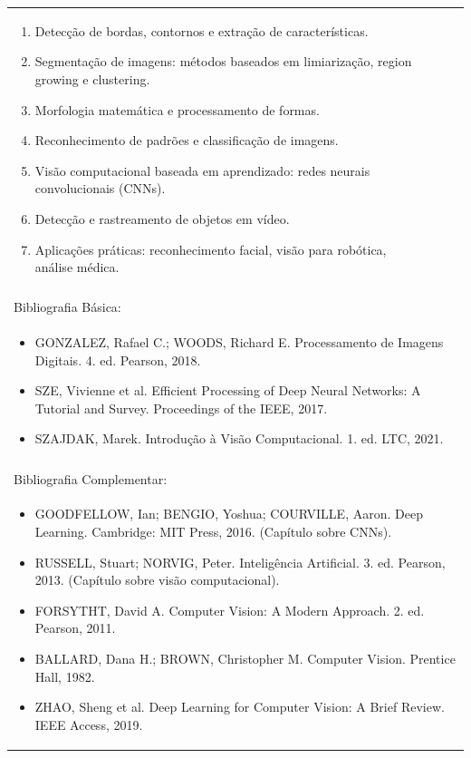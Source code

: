 \documentclass[11pt]{article}
\begin{document}
\begin{center}
\begin{longtable}{|p{4cm}|p{4cm}|p{4cm}|p{4cm}|}
{\begin{enumerate}
\item Detecção de bordas, contornos e extração de características.
\item Segmentação de imagens: métodos baseados em limiarização, region growing e clustering.
\item Morfologia matemática e processamento de formas.
\item Reconhecimento de padrões e classificação de imagens.
\item Visão computacional baseada em aprendizado: redes neurais convolucionais (CNNs).
\item Detecção e rastreamento de objetos em vídeo.
\item Aplicações práticas: reconhecimento facial, visão para robótica, análise médica.\end{enumerate}}\\
\multicolumn{4}{|p{16cm}|}{}\\
\hline
\multicolumn{4}{|p{16cm}|}{Bibliografia Básica:}\\
\multicolumn{4}{|p{16cm}|}{%
\begin{itemize}\item GONZALEZ, Rafael C.; WOODS, Richard E. Processamento de Imagens Digitais. 4. ed. Pearson, 2018.
\item SZE, Vivienne et al. Efficient Processing of Deep Neural Networks: A Tutorial and Survey. Proceedings of the IEEE, 2017.
\item SZAJDAK, Marek. Introdução à Visão Computacional. 1. ed. LTC, 2021.\end{itemize}}\\
\multicolumn{4}{|p{16cm}|}{}\\
\hline
\multicolumn{4}{|p{16cm}|}{Bibliografia Complementar:}\\
\multicolumn{4}{|p{16cm}|}{%
\begin{itemize}\item GOODFELLOW, Ian; BENGIO, Yoshua; COURVILLE, Aaron. Deep Learning. Cambridge: MIT Press, 2016. (Capítulo sobre CNNs).
\item RUSSELL, Stuart; NORVIG, Peter. Inteligência Artificial. 3. ed. Pearson, 2013. (Capítulo sobre visão computacional).
\item FORSYTHT, David A. Computer Vision: A Modern Approach. 2. ed. Pearson, 2011.
\item BALLARD, Dana H.; BROWN, Christopher M. Computer Vision. Prentice Hall, 1982.
\item ZHAO, Sheng et al. Deep Learning for Computer Vision: A Brief Review. IEEE Access, 2019.\end{itemize}}\\
\hline
\end{longtable}
\end{center}
\end{document}
